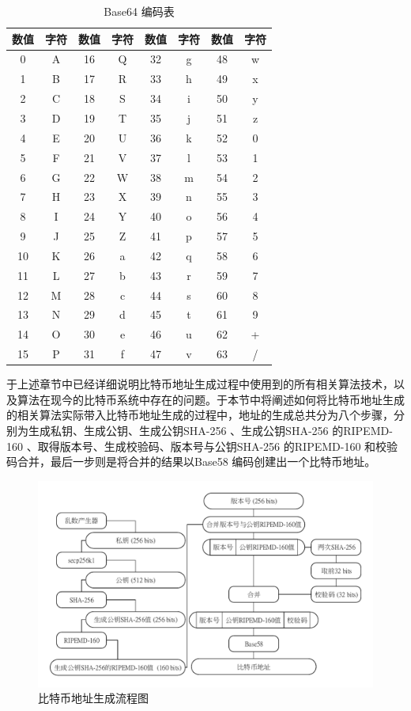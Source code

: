 					\begin{table}[!htbp]
					\centering
					\caption{Base64 编码表}
					\label{Base64}
					\begin{tabular}{|c|c|c|c|c|c|c|c|}
					\hline
					数值 & 字符 & 数值 & 字符 & 数值 & 字符 & 数值 & 字符 \\ \hline
					0 & A & 16 & Q & 32 & g & 48 & w \\ \hline
					1 & B & 17 & R & 33 & h & 49 & x \\ \hline
					2 & C & 18 & S & 34 & i & 50 & y \\ \hline
					3 & D & 19 & T & 35 & j & 51 & z \\ \hline
					4 & E & 20 & U & 36 & k & 52 & 0 \\ \hline
					5 & F & 21 & V & 37 & l & 53 & 1 \\ \hline
					6 & G & 22 & W & 38 & m & 54 & 2 \\ \hline
					7 & H & 23 & X & 39 & n & 55 & 3 \\ \hline
					8 & I & 24 & Y & 40 & o & 56 & 4 \\ \hline
					9 & J & 25 & Z & 41 & p & 57 & 5 \\ \hline
					10 & K & 26 & a & 42 & q & 58 & 6 \\ \hline
					11 & L & 27 & b & 43 & r & 59 & 7 \\ \hline
					12 & M & 28 & c & 44 & s & 60 & 8 \\ \hline
					13 & N & 29 & d & 45 & t & 61 & 9 \\ \hline
					14 & O & 30 & e & 46 & u & 62 & + \\ \hline
					15 & P & 31 & f & 47 & v & 63 & / \\ \hline
					\end{tabular}
					\end{table}
			于上述章节中已经详细说明⽐特币地址⽣成过程中使⽤到的所有相关算法技术，以及算法在现今的⽐特币系统中存在的问题。于本节中将阐述如何将比特币地址生成的相关算法实际带入比特币地址生成的过程中，地址的生成总共分为八个步骤，分别为生成私钥、生成公钥、生成公钥SHA-256 、生成公钥SHA-256 的RIPEMD-160 、取得版本号、生成校验码、版本号与公钥SHA-256 的RIPEMD-160 和校验码合并，最后一步则是将合并的结果以Base58 编码创建出一个比特币地址。

			\begin{figure}[!htbp]
					\centering
					\includegraphics[width = .9\textwidth]{address.pdf}
					\caption{比特币地址生成流程图}\label{address}
			\end{figure}

